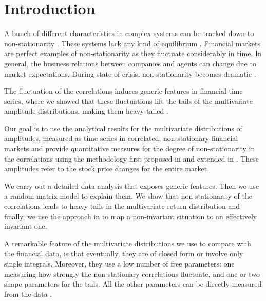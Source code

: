 \section{Introduction}\label{sec:introduction}

A bunch of different characteristics in complex systems can be tracked down to
non-stationarity \cite{non_stat_1,non_stat_2}. These systems lack any kind of
equilibrium \cite{comp_sys_1,comp_sys_2,comp_sys_3,comp_sys_4}. Financial
markets are perfect examples of non-stationarity as they fluctuate considerably
in time. In general, the business relations between companies and agents can
change due to market expectations. During state of crisis, non-stationarity
becomes dramatic
\cite{state_crisis_1,state_crisis_2,state_crisis_3,state_crisis_4,state_crisis_5,state_crisis_6,state_crisis_7}.

The fluctuation of the correlations induces generic features in financial time
series, where we showed that these fluctuations lift the tails of the
multivariate amplitude distributions, making them heavy-tailed
\cite{non_stationarity_fin_guhr,exact_distributions_guhr}.

Our goal is to use the analytical results for the multivariate distributions of
amplitudes, measured as time series in correlated, non-stationary financial
markets and provide quantitative measures for the degree of non-stationarity in
the correlations using the methodology first proposed in
\cite{non_stationarity_fin_guhr} and extended in
\cite{exact_distributions_guhr}. These amplitudes refer to the stock price
changes for the entire market.

We carry out a detailed data analysis that exposes generic features. Then we
use a random matrix model to explain them. We show that non-stationarity of the
correlations leads to heavy tails in the multivariate return distribution and
finally, we use the approach in
\cite{non_stationarity_fin_guhr,exact_distributions_guhr} to map
a non-invariant situation to an effectively invariant one.

A remarkable feature of the multivariate distributions we use to compare with
the financial data, is that eventually, they are of closed form or involve only
single integrals. Moreover, they use a low number of free parameters: one
measuring how strongly the non-stationary correlations fluctuate, and one or
two shape parameters for the tails. All the other parameters can be directly
measured from the data \cite{exact_distributions_guhr}.

